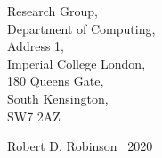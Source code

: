 \clearpage
\thispagestyle{empty}
\vspace*{\fill}

\begin{center}
Research Group,\\
Department of Computing,\\
Address 1,\\
Imperial College London,\\
180 Queens Gate,\\
South Kensington,\\
SW7 2AZ\\
\vspace{1cm}

Robert D. Robinson \textcopyright \, 2020\\
\end{center}

\vspace{2cm}